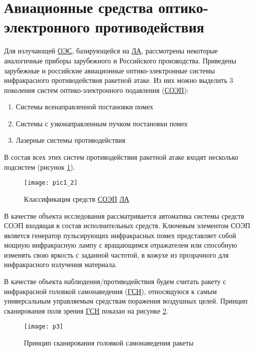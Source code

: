 \section{Авиационные средства оптико-электронного противодействия} \label{sec:ch1/sec2-}

Для излучающей  \hyperref[acroEOS]{ОЭС}, базирующейся на  \hyperref[acroLA]{ЛА}, рассмотрены некоторые аналогичные приборы зарубежного и Российского производства. Приведены зарубежные и российские авиационные оптико-электронные системы инфракрасного противодействия ракетной атаке. Из них можно выделить 3 поколения систем оптико-электронного подавления (\hyperref[acroSOEP]{СОЭП}):

\begin{enumerate}
	\item Системы всенаправленной постановки помех
	\item Системы с узконаправленным пучком постановки помех
	\item Лазерные системы противодействия 	
\end{enumerate}

В состав всех этих систем противодействия ракетной атаке входят несколько подсистем (рисунок \ref{fig:classification})\cite[]{ForeignMilitary}.

\begin{figure}[ht]
	\centering
	\texttt{[image: pic1\_2]} 
	\caption{Классификация средств  \hyperref[acroSOEP]{СОЭП}  \hyperref[acroLA]{ЛА} \cite[]{ForeignMilitary}}
	\label{fig:classification}
\end{figure}

В качестве объекта исследования рассматривается автоматика системы средств СОЭП входящая в состав исполнительных средств. Ключевым элементом СОЭП является генератор пульсирующих инфракрасных помех представляет собой мощную инфракрасную лампу с вращающимся отражателем или способную изменять свою яркость с заданной частотой, в кожухе из прозрачного для инфракрасного излучения материала.

В качестве объекта наблюдения/противодействия будем считать ракету с инфракрасной головкой самонаведения (\hyperref[acroGSN]{ГСН}), относящуюся к самым универсальным управляемым средствам поражения воздушных целей. Принцип сканирования поля зрения \hyperref[acroGSN]{ГСН} показан на рисунке \ref{fig:rocketScanning}. 

\begin{figure}[ht]
	\centering
	\texttt{[image: p3]} 
	\caption{Принцип сканирования головкой самонаведения ракеты}
	\label{fig:rocketScanning}
\end{figure}

